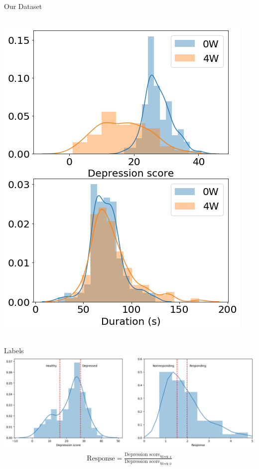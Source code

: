 \documentclass{beamer}
\begin{document}
\begin{frame}{Our Dataset}
\begin{columns}
        \vfill
			\includegraphics[width=\linewidth]{./Images/depscores_2.png}
	\end{columns}

\end{frame}


\begin{frame}{Labels}
  \centering
    \includegraphics[width=\linewidth]{./Images/labels.png}
    \\
    \begin{align*}
      \text{Response} = \frac{\text{Depression score}_{\text{Week 4}}}{\text{Depression score}_{\text{Week 0}}}
    \end{align*}
\end{frame}
\end{document}
